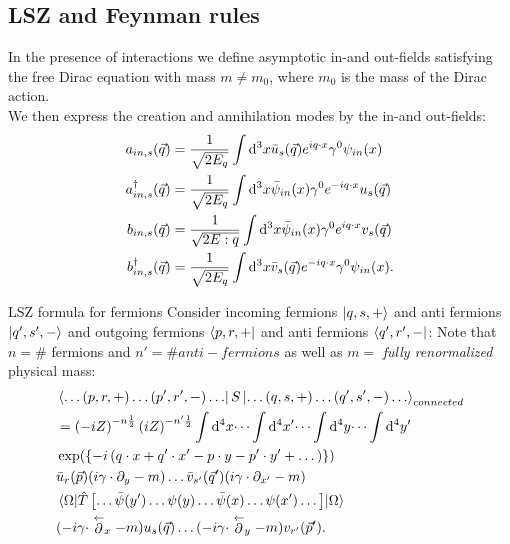 \subsection{LSZ and Feynman rules}
In the presence of interactions we define asymptotic in-and out-fields satisfying the free Dirac equation with mass $m\neq m_0$, where $m_0$ is the mass of the Dirac action.\\
We then express the creation and annihilation modes by the in-and out-fields:
\begin{align}
	a_{in,s}(\vec{q}) &= \frac{1}{\sqrt{2 E_q} } \int \mathrm{d}^3 x \bar{u}_s(\vec{q}) e^{i q\cdot  x} \gamma^0 \psi_{in}(x) \\
	a^{\dagger}_{in,s}(\vec{q}) &= \frac{1}{\sqrt{2 E_q}} \int \mathrm{d}^3 x \bar{\psi}_{in} (x) \gamma^0 e^{ -i q \cdot x} u_s(\vec{q}) \\
	b_{in,s}(\vec{q}) &= \frac{1}{\sqrt{2 E:q}} \int \mathrm{d}^3 x \bar{\psi}_{in}(x) \gamma^0 e^{i q\cdot x} v_s(\vec{q}) \\
	b^{\dagger}_{in,s}(\vec{q}) &= \frac{1}{\sqrt{2 E_q}} \int \mathrm{d}^3 x \bar{v}_s(\vec{q}) e^{-i q\cdot x} \gamma^0 \psi_{in}(x).
\end{align}
\begin{mybox}{LSZ formula for fermions}
Consider incoming fermions $\ket{q,s,+}$ and anti fermions $\ket{q',s',-}$ and outgoing fermions $\bra{p,r,+}$ and anti fermions $\bra{q',r',-}$: Note that $n=\#$ fermions and $n'=\# anti-fermions$ as well as $m=$ \emph{fully renormalized} physical mass:
\begin{align}
	&\bra{\dots (p,r,+) \dots (p',r',-) \dots} S \ket{\dots (q,s,+) \dots (q',s',-) \dots }_{connected}\nonumber  \\
	&= \left(-i Z\right)^{- n \frac{1}{2} } \left(i Z\right)^{- n' \frac{1}{2}}  \int \mathrm{d}^4 x \dots \int \mathrm{d}^4 x'\dots \int \mathrm{d}^4 y \dots \int \mathrm{d}^4 y'  \nonumber\\
	&\exp(\left\{ -i \left(q\cdot x+q'\cdot x'-p \cdot y - p'\cdot y' + \dots \right)     \right\}) \nonumber \\
	&\bar{u}_r(\vec{p})  (i \gamma \cdot \partial_y -m) \dots \bar{v}_{s'} (\vec{q}')(i \gamma \cdot \partial_{x'} -m) \nonumber \\
	& \expval{\hat{T}\left[\dots \bar{\psi}(y') \dots \psi(y) \dots \bar{\psi}(x) \dots \psi(x') \dots \right]}{\Omega}\nonumber \\
	& (-i \gamma \cdot \stackrel{\leftarrow}{\partial}_x -m) u_s(\vec{q}) \dots (-i \gamma \cdot \stackrel{\leftarrow}{\partial}_y -m) v_{r'}(\vec{p} ').
\end{align}
\end{mybox}
